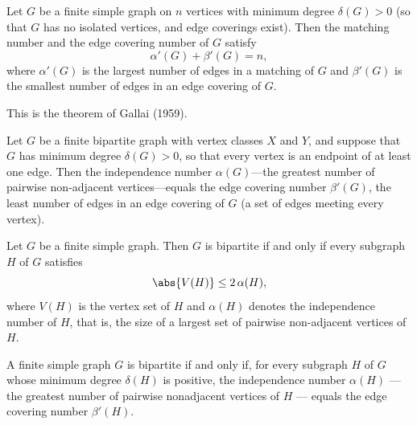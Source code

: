 \begin{theorem}
\label{SimpleGraph.matchingNumber_add_edgeCoveringNumber}
Let $G$ be a finite simple graph on $n$ vertices with minimum degree $\delta(G) > 0$ (so
that $G$ has no isolated vertices, and edge coverings exist). Then the matching number
and the edge covering number of $G$ satisfy
\[
\alpha'(G) + \beta'(G) = n,
\]
where $\alpha'(G)$ is the largest number of edges in a matching of $G$ and $\beta'(G)$
is the smallest number of edges in an edge covering of $G$.

This is the theorem of Gallai (1959).
\end{theorem}

\begin{theorem}
\label{SimpleGraph.indepNum_eq_edgeCoveringNumber}
Let $G$ be a finite bipartite graph with vertex classes $X$ and $Y$, and suppose that
$G$ has minimum degree $\delta(G) > 0$, so that every vertex is an endpoint of at least
one edge. Then the independence number $\alpha(G)$—the greatest number of pairwise
non-adjacent vertices—equals the edge covering number $\beta'(G)$, the least number of
edges in an edge covering of $G$ (a set of edges meeting every vertex).
\end{theorem}

\begin{theorem}
\label{SimpleGraph.isBipartite_iff_forall_subgraph_two_mul_indepNum_le}
Let $G$ be a finite simple graph. Then $G$ is bipartite if and only if every subgraph
$H$ of $G$ satisfies
\[
\abs{V(H)} \le 2\,\alpha(H),
\]
where $V(H)$ is the vertex set of $H$ and $\alpha(H)$ denotes the independence number of
$H$, that is, the size of a largest set of pairwise non-adjacent vertices of $H$.
\end{theorem}

\begin{theorem}
\label{SimpleGraph.isBipartite_iff_forall_subgraph_indepNum_eq_edgeCoveringNumber}
A finite simple graph $G$ is bipartite if and only if, for every subgraph $H$ of $G$
whose minimum degree $\delta(H)$ is positive, the independence number $\alpha(H)$ — the
greatest number of pairwise nonadjacent vertices of $H$ — equals the edge covering
number $\beta'(H)$.
\end{theorem}

